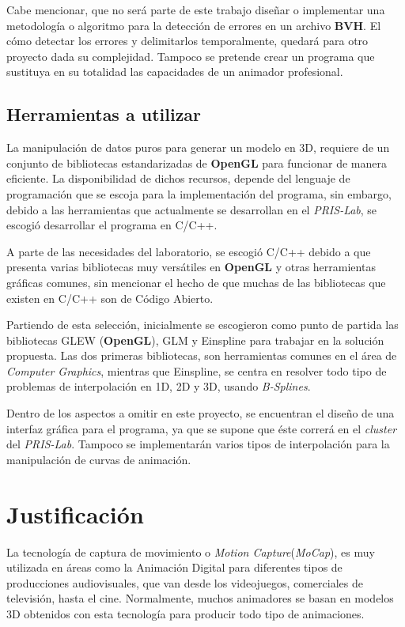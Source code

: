 Cabe mencionar, que no será parte de este trabajo diseñar o implementar una metodología o algoritmo para la detección de errores en un archivo \textbf{BVH}.  El cómo detectar los errores y delimitarlos temporalmente, quedará para otro proyecto dada su complejidad.  Tampoco se pretende crear un programa que sustituya en su totalidad las capacidades de un animador profesional.

\subsection{Herramientas a utilizar}

La manipulación de datos puros para generar un modelo en 3D, requiere de un conjunto de bibliotecas estandarizadas de \textbf{OpenGL} para funcionar de manera eficiente.  La disponibilidad de dichos recursos, depende del lenguaje de programación que se escoja para la implementación del programa, sin embargo, debido a las herramientas que actualmente se desarrollan en el \textit{PRIS-Lab}, se escogió desarrollar el programa en C/C++.

A parte de las necesidades del laboratorio, se escogió C/C++ debido a que presenta varias bibliotecas muy versátiles en \textbf{OpenGL} y otras herramientas gráficas comunes, sin mencionar el hecho de que muchas de las bibliotecas que existen en C/C++ son de Código Abierto.

Partiendo de esta selección, inicialmente se escogieron como punto de partida las bibliotecas GLEW (\textbf{OpenGL}), GLM y Einspline para trabajar en la solución propuesta.  Las dos primeras bibliotecas, son herramientas comunes en el área de \textit{Computer Graphics}, mientras que Einspline, se centra en resolver todo tipo de problemas de interpolación en 1D, 2D y 3D, usando \textit{B-Splines}.

Dentro de los aspectos a omitir en este proyecto, se encuentran el diseño de una interfaz gráfica para el programa, ya que se supone que éste correrá en el \textit{cluster} del \textit{PRIS-Lab}.  Tampoco se implementarán varios tipos de interpolación para la manipulación de curvas de animación.

\section{Justificación}

La tecnología de captura de movimiento o \textit{Motion Capture}(\textit{MoCap}), es muy utilizada en áreas como la Animación Digital para diferentes tipos de producciones audiovisuales, que van desde los videojuegos, comerciales de televisión, hasta el cine.  Normalmente, muchos animadores se basan en modelos 3D obtenidos con esta tecnología para producir todo tipo de animaciones.

